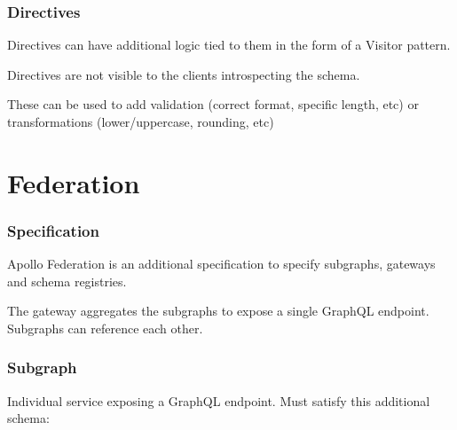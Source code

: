 \documentclass[notes]{beamer}
\begin{document}
\begin{frame}
  \frametitle{Directives} Directives can have additional logic tied to
  them in the form of a Visitor pattern.

  Directives are not visible to the clients introspecting the schema.

  These can be used to add validation (correct format, specific
  length, etc) or transformations (lower/uppercase, rounding, etc)
\end{frame}

\section{Federation}
\begin{frame}
  \frametitle{Specification} Apollo Federation is an additional
  specification to specify subgraphs, gateways and schema registries.

  The gateway aggregates the subgraphs to expose a single GraphQL
  endpoint. Subgraphs can reference each other.
\end{frame}

\begin{frame}
  \frametitle{Subgraph}
  Individual service exposing a GraphQL endpoint.
  Must satisfy this additional schema:






  
\end{frame}
\end{document}
